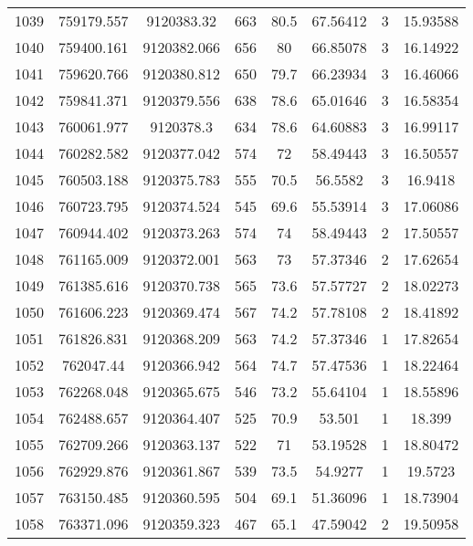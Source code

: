 \begin{longtable}{cccccccc}
1039 & 759179.557      & 9120383.32       & 663     & 80.5  & 67.56412 & 3  & 15.93588 \\
1040 & 759400.161      & 9120382.066      & 656     & 80    & 66.85078 & 3  & 16.14922 \\
1041 & 759620.766      & 9120380.812      & 650     & 79.7  & 66.23934 & 3  & 16.46066 \\
1042 & 759841.371      & 9120379.556      & 638     & 78.6  & 65.01646 & 3  & 16.58354 \\
1043 & 760061.977      & 9120378.3        & 634     & 78.6  & 64.60883 & 3  & 16.99117 \\
1044 & 760282.582      & 9120377.042      & 574     & 72    & 58.49443 & 3  & 16.50557 \\
1045 & 760503.188      & 9120375.783      & 555     & 70.5  & 56.5582  & 3  & 16.9418  \\
1046 & 760723.795      & 9120374.524      & 545     & 69.6  & 55.53914 & 3  & 17.06086 \\
1047 & 760944.402      & 9120373.263      & 574     & 74    & 58.49443 & 2  & 17.50557 \\
1048 & 761165.009      & 9120372.001      & 563     & 73    & 57.37346 & 2  & 17.62654 \\
1049 & 761385.616      & 9120370.738      & 565     & 73.6  & 57.57727 & 2  & 18.02273 \\
1050 & 761606.223      & 9120369.474      & 567     & 74.2  & 57.78108 & 2  & 18.41892 \\
1051 & 761826.831      & 9120368.209      & 563     & 74.2  & 57.37346 & 1  & 17.82654 \\
1052 & 762047.44       & 9120366.942      & 564     & 74.7  & 57.47536 & 1  & 18.22464 \\
1053 & 762268.048      & 9120365.675      & 546     & 73.2  & 55.64104 & 1  & 18.55896 \\
1054 & 762488.657      & 9120364.407      & 525     & 70.9  & 53.501   & 1  & 18.399   \\
1055 & 762709.266      & 9120363.137      & 522     & 71    & 53.19528 & 1  & 18.80472 \\
1056 & 762929.876      & 9120361.867      & 539     & 73.5  & 54.9277  & 1  & 19.5723  \\
1057 & 763150.485      & 9120360.595      & 504     & 69.1  & 51.36096 & 1  & 18.73904 \\
1058 & 763371.096      & 9120359.323      & 467     & 65.1  & 47.59042 & 2  & 19.50958 \\

\end{longtable}
